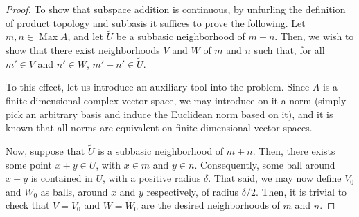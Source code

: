 \documentclass{article}
\theoremstyle{plain}
\theoremstyle{nonumberplain}
\newtheorem{proof}{Proof}
\DeclareMathOperator{\Max}{Max}
\begin{document}
\begin{proof}
To show that subspace addition is continuous, by unfurling the definition of product topology and subbasis it suffices to prove the following. Let $m,n \in \Max A$, and let $\tilde U$ be a subbasic neighborhood of $m+n$. Then, we wish to show that there exist neighborhoods $V$ and $W$ of $m$ and $n$ such that, for all $m' \in V$ and $n' \in W$, $m'+n' \in \tilde U$.

To this effect, let us introduce an auxiliary tool into the problem. Since $A$ is a finite dimensional complex vector space, we may introduce on it a norm (simply pick an arbitrary basis and induce the Euclidean norm based on it), and it is known that all norms are equivalent on finite dimensional vector spaces.

Now, suppose that $\tilde U$ is a subbasic neighborhood of $m+n$. Then, there exists some point $x+y \in U$, with $x \in m$ and $y \in n$. Consequently, some ball around $x+y$ is contained in $U$, with a positive radius $\delta$. That said, we may now define $V_0$ and $W_0$ as balls, around $x$ and $y$ respectively, of radius $\delta/2$. Then, it is trivial to check that $V = \tilde{V_0}$ and $W = \tilde{W_0}$ are the desired neighborhoods of $m$ and $n$.
\end{proof}



\nocite{measurement}

{}

\end{document}
